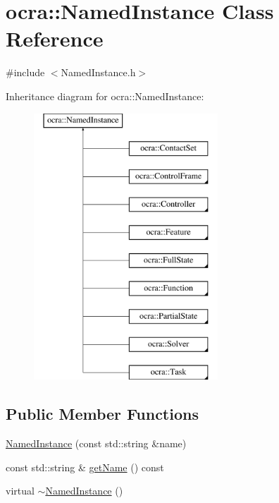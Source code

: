 \hypertarget{classocra_1_1NamedInstance}{}\section{ocra\+:\+:Named\+Instance Class Reference}
\label{classocra_1_1NamedInstance}


{\ttfamily \#include $<$Named\+Instance.\+h$>$}

Inheritance diagram for ocra\+:\+:Named\+Instance\+:\begin{figure}[H]
\begin{center}
\leavevmode
\includegraphics[height=10.000000cm]{db/de3/classocra_1_1NamedInstance}
\end{center}
\end{figure}
\subsection*{Public Member Functions}
\begin{DoxyCompactItemize}
\item 
\hyperlink{classocra_1_1NamedInstance_a561d3cf2c7b1120ff3160c55ec89afbb}{Named\+Instance} (const std\+::string \&name)
\item 
const std\+::string \& \hyperlink{classocra_1_1NamedInstance_a8ef1a2cbd11f1308774eff3f61c53ae1}{get\+Name} () const
\item 
virtual \hyperlink{classocra_1_1NamedInstance_a0caaa1040def535f34f527b7f7f590cf}{$\sim$\+Named\+Instance} ()
\end{DoxyCompactItemize}


